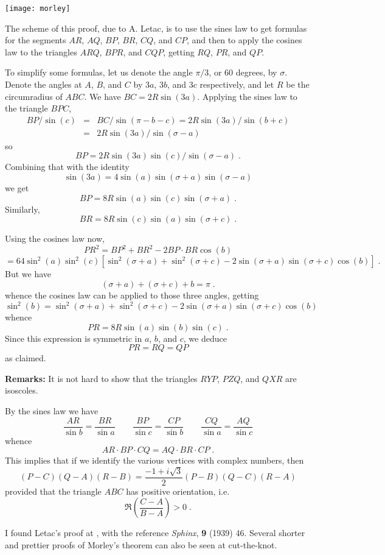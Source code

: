 \documentclass[12pt]{article}
\begin{document}
 
 
 
\begin{center}
\texttt{[image: morley]}
\end{center}
The scheme of this proof, due to A. Letac,
is to use the sines law to get formulas for the segments
$AR$, $AQ$, $BP$, $BR$, $CQ$, and $CP$,
and then to apply the cosines law to the triangles $ARQ$, $BPR$, and $CQP$,
getting $RQ$, $PR$, and $QP$.

To simplify some formulas, let us denote the angle $\pi/3$, or 60 degrees,
by $\sigma$.
Denote the angles at $A$, $B$, and $C$ by $3a$, $3b$, and $3c$ respectively,
and let $R$ be the circumradius of $ABC$. We have
$BC = 2R \sin(3a)$. Applying the sines law to the triangle $BPC$,
\begin{eqnarray}
BP/\sin(c) &=& BC/\sin(\pi - b - c) = 2R \sin(3a)/\sin(b + c) \\
           &=& 2R\sin(3a)/\sin(\sigma - a)
\end{eqnarray}
so
$$BP = 2R\sin(3a)\sin(c)/\sin(\sigma - a)\;.$$
Combining that with the identity
$$\sin(3a) = 4\sin(a)\sin(\sigma + a)\sin(\sigma -a)$$
we get
$$BP = 8R\sin(a)\sin(c)\sin(\sigma + a)\;.$$
Similarly,
$$BR = 8R\sin(c)\sin(a)\sin(\sigma + c)\;.$$

Using the cosines law now,
$$PR^2 = BP^2 + BR^2 - 2 BP\cdot BR\cos(b)$$
$$= 64 \sin^2(a)\sin^2(c)[
\sin^2(\sigma + a) + \sin^2(\sigma+ c) -
 2\sin(\sigma + a)\sin(\sigma + c)\cos(b)]\;.$$
But we have
$$(\sigma + a) + (\sigma + c) + b = \pi\;.$$
whence the cosines law can be applied to those three angles, getting
$$\sin^2(b) = \sin^2(\sigma + a) + \sin^2(\sigma + c) -
2\sin(\sigma + a)\sin(\sigma + c)\cos(b)$$
whence
$$PR = 8R\sin(a)\sin(b)\sin(c)\;.$$
Since this expression is symmetric in $a$, $b$, and $c$, we deduce
$$PR = RQ = QP$$
as claimed.

\noindent
\textbf{Remarks: }It is not hard to show that the triangles $RYP$, $PZQ$,
and $QXR$ are isoscoles.

By the sines law we have
$$\frac{AR}{\sin b}=\frac{BR}{\sin a}\qquad
\frac{BP}{\sin c}=\frac{CP}{\sin b}\qquad
\frac{CQ}{\sin a}=\frac{AQ}{\sin c}$$
whence
$$AR\cdot BP\cdot CQ = AQ\cdot BR\cdot CP\;.$$
This implies that if we identify the various vertices
with complex numbers, then
$$(P-C)(Q-A)(R-B)=\frac{-1+i\sqrt{3}}{2}(P-B)(Q-C)(R-A)$$
provided that the triangle $ABC$ has positive orientation, i.e.
$$\Re\left(\frac{C-A}{B-A}\right)>0\;.$$

I found Letac's proof at
,
with the reference \emph{Sphinx}, \textbf{9} (1939) 46.
Several shorter and prettier proofs of Morley's theorem can also be
seen at cut-the-knot.
\end{document}
